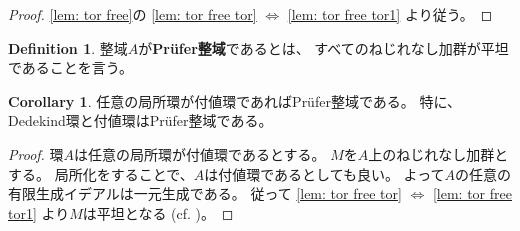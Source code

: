 \documentclass[uplatex]{jsarticle}
\theoremstyle{definition}
\newtheorem{prop}[prop]{Proposition}
\newtheorem{cor}[cor]{Corollary}
\newtheorem{defi}[defi]{Definition}
\newcommand{\dfn}{:\overset{\mathrm{\scriptsize def}}{=}}
\begin{document}
\begin{proof}
  \autoref{lem: tor free}の
  \ref{lem: tor free tor} \(\Leftrightarrow\) \ref{lem: tor free tor1}
  より従う。
\end{proof}

%
%
%




\begin{defi}
  整域\(A\)が\textbf{Pr\"{u}fer整域}であるとは、
  すべてのねじれなし加群が平坦であることを言う。
\end{defi}



\begin{cor}
  任意の局所環が付値環であればPr\"{u}fer整域である。
  特に、Dedekind環と付値環はPr\"{u}fer整域である。
\end{cor}

\begin{proof}
  環\(A\)は任意の局所環が付値環であるとする。
  \(M\)を\(A\)上のねじれなし加群とする。
  局所化をすることで、\(A\)は付値環であるとしても良い。
  よって\(A\)の任意の有限生成イデアルは一元生成である。
  従って
  \ref{lem: tor free tor} \(\Leftrightarrow\) \ref{lem: tor free tor1}
  より\(M\)は平坦となる
  (cf. \cite[演習2.26]{AM})。
\end{proof}
\end{document}
